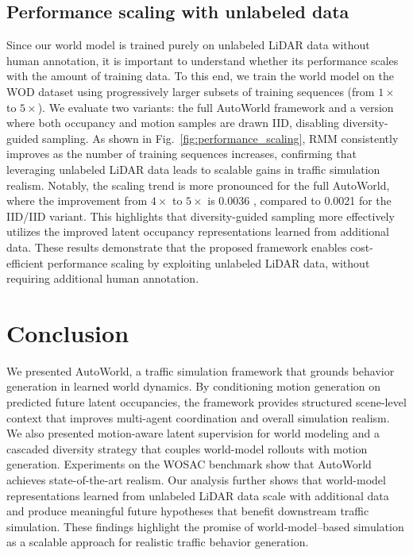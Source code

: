\documentclass[runningheads]{llncs}
\begin{document}
\vspace{-2mm}
\subsection{Performance scaling with unlabeled data}

Since our world model is trained purely on unlabeled LiDAR data without human annotation, it is important to understand whether its performance scales with the amount of training data. To this end, we train the world model on the WOD dataset using progressively larger subsets of training sequences (from $1 \times$ to $5 \times$). We evaluate two variants: the full AutoWorld framework and a version where both occupancy and motion samples are drawn IID, disabling diversity-guided sampling. As shown in Fig.~\ref{fig:performance_scaling}, RMM consistently improves as the number of training sequences increases, confirming that leveraging unlabeled LiDAR data leads to scalable gains in traffic simulation realism. Notably, the scaling trend is more pronounced for the full AutoWorld, where the improvement from $4 \times$ to $5 \times$ is 0.0036 , compared to 0.0021 for the IID/IID variant. This highlights that diversity-guided sampling more effectively utilizes the improved latent occupancy representations learned from additional data. These results demonstrate that the proposed framework enables cost-efficient performance scaling by exploiting unlabeled LiDAR data, without requiring additional human annotation.


\vspace{-1.1mm}

\section{Conclusion}
We presented AutoWorld, a traffic simulation framework that grounds behavior generation in learned world dynamics. By conditioning motion generation on predicted future latent occupancies, the framework provides structured scene-level context that improves multi-agent coordination and overall simulation realism. We also presented motion-aware latent supervision for world modeling and a cascaded diversity strategy that couples world-model rollouts with motion generation. Experiments on the WOSAC benchmark show that AutoWorld achieves state-of-the-art realism. Our analysis further shows that world-model representations learned from unlabeled LiDAR data scale with additional data and produce meaningful future hypotheses that benefit downstream traffic simulation. These findings highlight the promise of world-model–based simulation as a scalable approach for realistic traffic behavior generation.
\end{document}
